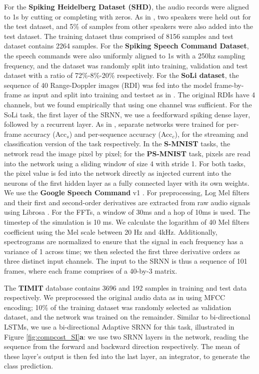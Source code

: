 \documentclass[fleqn,10pt]{wlscirep}
\begin{document}
For the {\bf Spiking Heidelberg Dataset (SHD)}, the audio records were aligned to 1s by cutting or completing with zeros. As in \cite{cramer2019heidelberg}, two speakers were held out for the test dataset, and 5\% of samples from other speakers were also added into the test dataset. The training dataset thus comprised of 8156 samples and test dataset contains 2264 samples. For the {\bf Spiking Speech Command Dataset}, 
the speech commands were also uniformly aligned to 1s with a 250hz sampling frequency, and the dataset was randomly split into training, validation and test dataset with a ratio of 72\%-8\%-20\% respectively.
For the {\bf SoLi dataset}, the sequence of 40 Range-Doppler images (RDI) was fed into the model frame-by-frame as input and split into training and testset as in \cite{wang2016interacting}. 
The original RDIs have 4 channels, but we found empirically that using one channel was sufficient. For the SoLi task, the first layer of the SRNN, we use a feedforward spiking dense layer, followed by a recurrent layer. As in \cite{wang2016interacting}, separate networks were trained for per-frame accuracy (Acc$_s$) and per-sequence accuracy (Acc$_c$), for the streaming and classification version of the task respectively. In the {\bf S-MNIST} tasks, the network read the image pixel by pixel; for the {\bf PS-MNIST} task, pixels are read into the network using a sliding window of size 4 with stride 1. For both tasks, the pixel value is fed into the network directly as injected current into the neurons of the first hidden layer as a fully connected layer with its own weights.  We use the {\bf Google Speech Command}  v1 \cite{warden2018speech}. 
For preprocessing, Log Mel filters and their first and second-order derivatives are extracted from raw audio signals using Librosa \cite{mcfee2015librosa}. For the FFTs, a window of 30ms and a hop of 10ms is used. The timestep of the simulation is 10 ms. We calculate the logarithm of 40 Mel filters coefficient using the Mel scale between 20 Hz and 4kHz. Additionally, spectrograms are normalized to ensure that the signal in each frequency has a variance of 1 across time; we then selected the first three derivative orders as three distinct input channels. The input to the SRNN is thus a sequence of 101 frames, where each frame comprises of a 40-by-3 matrix. 




The {\bf TIMIT} database contains 3696 and 192 samples in training and test data respectively. We preprocessed the original audio data as in \cite{bellec2020solution} using MFCC encoding; 10\% of the training dataset was randomly selected as validation dataset, and the network was trained on the remainder. Similar to bi-directional LSTMs, we use a bi-directional Adaptive SRNN for this task, illustrated in Figure \ref{fig:compcost_SI}\textbf{a}: we use  two SRNN layers in the network, reading the sequence from the forward and backward direction respectively. The mean of these layer's output is then fed into the last layer, an integrator, to generate the class prediction. 
\end{document}
